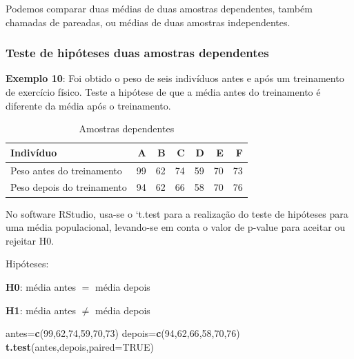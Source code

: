 \documentclass[12pt,brazil,]{book}
\newenvironment{Shaded}{\begin{snugshade}}{\end{snugshade}}
\newcommand{\DataTypeTok}[1]{\textcolor[rgb]{0.13,0.29,0.53}{#1}}
\newcommand{\DecValTok}[1]{\textcolor[rgb]{0.00,0.00,0.81}{#1}}
\newcommand{\KeywordTok}[1]{\textcolor[rgb]{0.13,0.29,0.53}{\textbf{#1}}}
\newcommand{\NormalTok}[1]{#1}
\newcommand{\OtherTok}[1]{\textcolor[rgb]{0.56,0.35,0.01}{#1}}
\begin{document}
Podemos comparar duas médias de duas amostras dependentes, também
chamadas de pareadas, ou médias de duas amostras independentes.

\hypertarget{teste-de-hipoteses-duas-amostras-dependentes}{%
\subsubsection{Teste de hipóteses duas amostras
dependentes}\label{teste-de-hipoteses-duas-amostras-dependentes}}

\textbf{Exemplo 10}: Foi obtido o peso de seis indivíduos antes e após
um treinamento de exercício físico. Teste a hipótese de que a média
antes do treinamento é diferente da média após o treinamento.

\begin{table}

\caption{\label{tab:unnamed-chunk-108}Amostras dependentes}
\centering
\begin{tabular}[t]{l|r|r|r|r|r|r}
\hline
Indivíduo & A & B & C & D & E & F\\
\hline
Peso antes do treinamento & 99 & 62 & 74 & 59 & 70 & 73\\
\hline
Peso depois do treinamento & 94 & 62 & 66 & 58 & 70 & 76\\
\hline
\end{tabular}
\end{table}

No software RStudio, usa-se o `t.test\textbar{} para a realização do
teste de hipóteses para uma média populacional, levando-se em conta o
valor de p-value para aceitar ou rejeitar H0.

Hipóteses:

\textbf{H0}: média antes \(=\) média depois

\textbf{H1}: média antes \(\neq\) média depois

\begin{Shaded}
\begin{Highlighting}[]
\NormalTok{antes=}\KeywordTok{c}\NormalTok{(}\DecValTok{99}\NormalTok{,}\DecValTok{62}\NormalTok{,}\DecValTok{74}\NormalTok{,}\DecValTok{59}\NormalTok{,}\DecValTok{70}\NormalTok{,}\DecValTok{73}\NormalTok{)}
\NormalTok{depois=}\KeywordTok{c}\NormalTok{(}\DecValTok{94}\NormalTok{,}\DecValTok{62}\NormalTok{,}\DecValTok{66}\NormalTok{,}\DecValTok{58}\NormalTok{,}\DecValTok{70}\NormalTok{,}\DecValTok{76}\NormalTok{)}
\KeywordTok{t.test}\NormalTok{(antes,depois,}\DataTypeTok{paired=}\OtherTok{TRUE}\NormalTok{)}
\end{Highlighting}
\end{Shaded}
\end{document}

